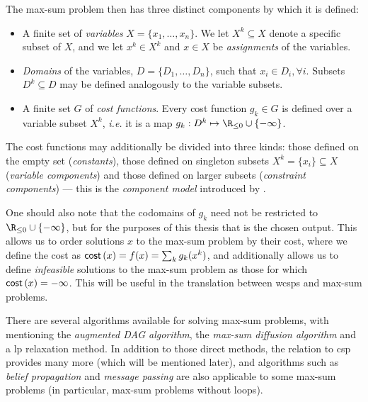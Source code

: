 The max-sum problem then has three distinct components by which it is defined:
\begin{itemize}
	\item A finite set of \emph{variables} \(X = \{x_1, \dotsc, x_n\}\). We let \(X^k \subseteq X\) denote a specific subset of \(X\), and we let \(x^k \in X^k\) and \(x \in X\) be \emph{assignments} of the variables.
	\item \emph{Domains} of the variables, \(D = \{D_1, \dotsc, D_n\}\), such that \(x_i \in D_i, \forall i\). Subsets \(D^k \subseteq D\) may be defined analogously to the variable subsets.
	\item A finite set \(G\) of \emph{cost functions}. Every cost function \(g_k \in G\) is defined over a variable subset \(X^k\), \emph{i.e.} it is a map \(g_k : D^k \mapsto \Rminus \cup \{-\infty\}\).
\end{itemize}
The cost functions may additionally be divided into three kinds: those defined on the empty set (\emph{constants}), those defined on singleton subsets \(X^k = \{x_i\} \subseteq X\) (\emph{variable components}) and those defined on larger subsets (\emph{constraint components}) --- this is the \emph{component model}\label{pg:component-model} introduced by \textcite[\pno~98]{Wedelin08}.

One should also note that the codomains of \(g_k\) need not be restricted to \(\Rminus \cup \{-\infty\}\), but for the purposes of this thesis that is the chosen output.
This allows us to order solutions \(x\) to the max-sum problem by their cost, where we define the cost as \(\operatorname{\mathsf{cost}}\left(x\right) = f(x) = \sum_k g_k(x^k)\), and additionally allows us to define \emph{infeasible} solutions to the max-sum problem as those for which \(\operatorname{\mathsf{cost}}\left(x\right) = -\infty\).
This will be useful in the translation between \glspl{wcsp} and max-sum problems.


There are several algorithms available for solving max-sum problems, with \textcite{Werner07} mentioning the \emph{augmented DAG algorithm}, the \emph{max-sum diffusion algorithm} and a \gls{lp} relaxation method.
In addition to those direct methods, the relation to \gls{csp} provides many more (which will be mentioned later), and algorithms such as \emph{belief propagation} and \emph{message passing} are also applicable to some max-sum problems (in particular, max-sum problems without loops).

